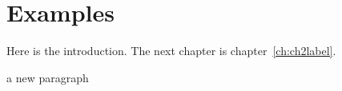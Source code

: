 \chapter{Examples}\label{ch:introduction}
Here is the introduction. The next chapter is chapter~\ref{ch:ch2label}.


a new paragraph